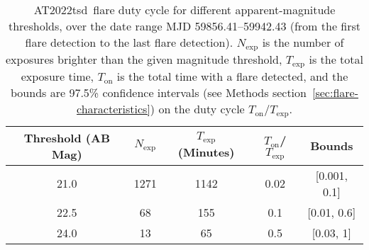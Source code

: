 \documentclass{nature_plusfigure}
\newcommand{\at}{AT2022tsd}
\begin{document}
\begin{extended_data}
\begin{table}
\begin{center}
\caption{\at\ flare duty cycle for different apparent-magnitude thresholds, over the date range MJD 59856.41--59942.43 (from the first flare detection to the last flare detection). $N_\mathrm{exp}$ is the number of exposures brighter than the given magnitude threshold, $T_\mathrm{exp}$ is the total exposure time, $T_\mathrm{on}$ is the total time with a flare detected, and the bounds are 97.5\% confidence intervals (see Methods section~\ref{sec:flare-characteristics}) on the duty cycle $T_\mathrm{on}/T_\mathrm{exp}$. }
\label{tab:flare-stats}
\begin{tabular}{ccccc} 
\hline\hline
Threshold (AB Mag) & $N_\mathrm{exp}$ & $T_\mathrm{exp}$ (Minutes) & $T_\mathrm{on}$/$T_\mathrm{exp}$ & Bounds \\
\hline
21.0 & 1271 & 1142 & 0.02 & [0.001, 0.1] \\
22.5 & 68 & 155 & 0.1 & [0.01, 0.6]  \\
24.0 & 13 & 65 & 0.5 & [0.03, 1] \\
\hline
\end{tabular}
\end{center}
\end{table}


\end{extended_data}

\clearpage
\end{document}
